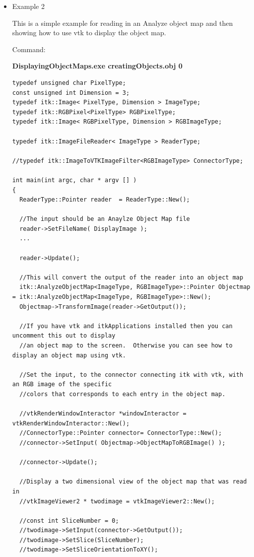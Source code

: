 \documentclass{InsightArticle}
\begin{document}
\begin{itemize}
\item Example 2

This is a simple example for reading in an Analyze object map and
then showing how to use vtk to display the object map. 


Command:

\textbf{DisplayingObjectMaps.exe creatingObjects.obj 0}

\small \begin{verbatim}
typedef unsigned char PixelType;
const unsigned int Dimension = 3;
typedef itk::Image< PixelType, Dimension > ImageType;
typedef itk::RGBPixel<PixelType> RGBPixelType;
typedef itk::Image< RGBPixelType, Dimension > RGBImageType;

typedef itk::ImageFileReader< ImageType > ReaderType;

//typedef itk::ImageToVTKImageFilter<RGBImageType> ConnectorType;

int main(int argc, char * argv [] )
{
  ReaderType::Pointer reader  = ReaderType::New();
  
  //The input should be an Anaylze Object Map file
  reader->SetFileName( DisplayImage );
  ...
  
  reader->Update();
  
  //This will convert the output of the reader into an object map
  itk::AnalyzeObjectMap<ImageType, RGBImageType>::Pointer Objectmap = itk::AnalyzeObjectMap<ImageType, RGBImageType>::New();
  Objectmap->TransformImage(reader->GetOutput());
  
  //If you have vtk and itkApplications installed then you can uncomment this out to display
  //an object map to the screen.  Otherwise you can see how to display an object map using vtk.
  
  //Set the input, to the connector connecting itk with vtk, with an RGB image of the specific
  //colors that corresponds to each entry in the object map.
  
  //vtkRenderWindowInteractor *windowInteractor = vtkRenderWindowInteractor::New();
  //ConnectorType::Pointer connector= ConnectorType::New();
  //connector->SetInput( Objectmap->ObjectMapToRGBImage() );
  
  //connector->Update();
  
  //Display a two dimensional view of the object map that was read in
  //vtkImageViewer2 * twodimage = vtkImageViewer2::New();
  
  //const int SliceNumber = 0;
  //twodimage->SetInput(connector->GetOutput());
  //twodimage->SetSlice(SliceNumber);
  //twodimage->SetSliceOrientationToXY();
  

\end{verbatim}
\end{itemize}
\end{document}
